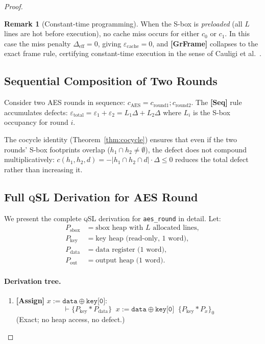 \documentclass[acmsmall,sigplan,anonymous,review,screen]{acmart}
\theoremstyle{plain}
\theoremstyle{definition}
\newtheorem{remark}[theorem]{Remark}
\newcommand{\qSL}{\textsc{qSL}\xspace}
\newcommand{\sep}{*}
\newcommand{\defect}{\varepsilon}
\begin{document}
\begin{proof}
\begin{remark}[Constant-time programming]
  When the S-box is \emph{preloaded} (all $L$ lines are hot before
  execution), no cache miss occurs for either $c_0$ or $c_1$.
  In this case the miss penalty $\Delta_{\mathrm{eff}} = 0$, giving
  $\defect_{\mathrm{cache}} = 0$, and \textbf{[GrFrame]} collapses to the
  exact frame rule, certifying constant-time execution in the sense of
  Cauligi et al.~\cite{cauligi2020constant}.
\end{remark}

\subsection{Sequential Composition of Two Rounds}
\label{sec:casestudy:comp}

Consider two AES rounds in sequence:
$c_{\mathrm{AES}} = c_{\mathrm{round1}}; c_{\mathrm{round2}}$.
The \textbf{[Seq]} rule accumulates defects:
$\defect_{\mathrm{total}} = \defect_1 + \defect_2 = L_1 \Delta + L_2 \Delta$
where $L_i$ is the S-box occupancy for round $i$.

The cocycle identity (Theorem~\ref{thm:cocycle}) ensures that even if
the two rounds' S-box footprints overlap ($h_1 \cap h_2 \neq \emptyset$),
the defect does not compound multiplicatively:
$c(h_1, h_2, d) = -|h_1 \cap h_2 \cap d| \cdot \Delta \leq 0$
reduces the total defect rather than increasing it.

\subsection{Full \qSL Derivation for AES Round}
\label{sec:casestudy:deriv}

We present the complete \qSL derivation for \texttt{aes\_round} in detail.
Let:
\begin{align*}
  P_{\mathrm{sbox}} &= \text{sbox heap with }L\text{ allocated lines}, \\
  P_{\mathrm{key}}  &= \text{key heap (read-only, 1 word)}, \\
  P_{\mathrm{data}} &= \text{data register (1 word)}, \\
  P_{\mathrm{out}}  &= \text{output heap (1 word)}.
\end{align*}

\paragraph{Derivation tree.}
\begin{enumerate}[label=\arabic*.,itemsep=2pt]
  \item \textbf{[Assign]} $x := \texttt{data} \oplus \texttt{key[0]}$:
    \[
      \vdash \{P_{\mathrm{key}} \sep P_{\mathrm{data}}\}\;\;
      x := \texttt{data} \oplus \texttt{key[0]}\;\;
      \{P_{\mathrm{key}} \sep P_x\}_0
    \]
    (Exact; no heap access, no defect.)


\end{enumerate}
\end{proof}
\end{document}
